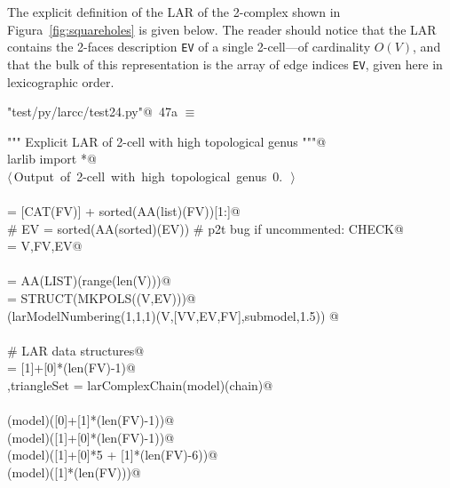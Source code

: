 \documentclass[11pt,oneside]{article}	%
\begin{document}
The explicit definition of the LAR of the 2-complex shown in Figura~\ref{fig:squareholes} is given below. The reader should notice that the LAR contains the 2-faces description \texttt{EV} of a single 2-cell---of cardinality $O(V)$, and that the bulk of this representation is the array of edge indices \texttt{EV}, given here in lexicographic order.

\begin{flushleft} \small \label{scrap78}
\protect{}\verb@"test/py/larcc/test24.py"@\nobreak\ {\footnotesize 47a }$\equiv$
\vspace{-1ex}
\begin{list}{}{} \item
\mbox{}\verb@""" Explicit LAR of 2-cell with high topological genus """@\\
\mbox{}\verb@from larlib import *@\\
\mbox{}\verb@@\hbox{$\langle\,$Output of 2-cell with high topological genus 0.\nobreak\ {\footnotesize {}}$\,\rangle$}\verb@@\\
\mbox{}\verb@@\\
\mbox{}\verb@FV = [CAT(FV)] + sorted(AA(list)(FV))[1:]@\\
\mbox{}\verb@# EV = sorted(AA(sorted)(EV))  # p2t bug if uncommented: CHECK@\\
\mbox{}\verb@model = V,FV,EV@\\
\mbox{}\verb@@\\
\mbox{}\verb@VV = AA(LIST)(range(len(V)))@\\
\mbox{}\verb@submodel = STRUCT(MKPOLS((V,EV)))@\\
\mbox{}\verb@VIEW(larModelNumbering(1,1,1)(V,[VV,EV,FV],submodel,1.5)) @\\
\mbox{}\verb@@\\
\mbox{}\verb@# LAR data structures@\\
\mbox{}\verb@chain = [1]+[0]*(len(FV)-1)@\\
\mbox{}\verb@outModel,triangleSet = larComplexChain(model)(chain)@\\
\mbox{}\verb@@\\
\mbox{}\verb@viewLarComplexChain(model)([0]+[1]*(len(FV)-1))@\\
\mbox{}\verb@viewLarComplexChain(model)([1]+[0]*(len(FV)-1))@\\
\mbox{}\verb@viewLarComplexChain(model)([1]+[0]*5 + [1]*(len(FV)-6))@\\
\mbox{}\verb@viewLarComplexChain(model)([1]*(len(FV)))@\\
\mbox{}\verb@@{\NWsep}
\end{list}
\vspace{-2ex}
\end{flushleft}
\end{document}
